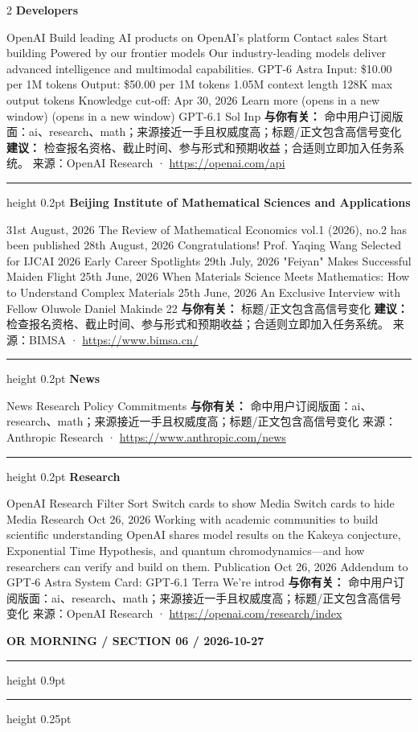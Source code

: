 \documentclass[10.5pt]{ctexart}
\begin{document}
\begin{multicols}{2}
{\large\bfseries Developers}\par
OpenAI Build leading AI products on OpenAI’s platform Contact sales Start building Powered by our frontier models Our industry-leading models deliver advanced intelligence and multimodal capabilities. GPT-6 Astra Input: \$10.00 per 1M tokens Output: \$50.00 per 1M tokens 1.05M context length 128K max output tokens Knowledge cut-off: Apr 30, 2026 Learn more (opens in a new window) (opens in a new window) GPT-6.1 Sol Inp
\textbf{与你有关：} 命中用户订阅版面：ai、research、math；来源接近一手且权威度高；标题/正文包含高信号变化
\textbf{建议：} 检查报名资格、截止时间、参与形式和预期收益；合适则立即加入任务系统。
{\footnotesize\color{ormuted} 来源：OpenAI Research · \url{https://openai.com/api}}
\vspace{2mm}
\hrule height 0.2pt
\vspace{2mm}
{\large\bfseries Beijing Institute of Mathematical Sciences and Applications}\par
31st August, 2026 The Review of Mathematical Economics vol.1 (2026), no.2 has been published 28th August, 2026 Congratulations! Prof. Yaqing Wang Selected for IJCAI 2026 Early Career Spotlights 29th July, 2026 "Feiyan" Makes Successful Maiden Flight 25th June, 2026 When Materials Science Meets Mathematics: How to Understand Complex Materials 25th June, 2026 An Exclusive Interview with Fellow Oluwole Daniel Makinde 22
\textbf{与你有关：} 标题/正文包含高信号变化
\textbf{建议：} 检查报名资格、截止时间、参与形式和预期收益；合适则立即加入任务系统。
{\footnotesize\color{ormuted} 来源：BIMSA · \url{https://www.bimsa.cn/}}
\vspace{2mm}
\hrule height 0.2pt
\vspace{2mm}
{\large\bfseries News}\par
News Research Policy Commitments
\textbf{与你有关：} 命中用户订阅版面：ai、research、math；来源接近一手且权威度高；标题/正文包含高信号变化
{\footnotesize\color{ormuted} 来源：Anthropic Research · \url{https://www.anthropic.com/news}}
\vspace{2mm}
\hrule height 0.2pt
\vspace{2mm}
{\large\bfseries Research}\par
OpenAI Research Filter Sort Switch cards to show Media Switch cards to hide Media Research Oct 26, 2026 Working with academic communities to build scientific understanding OpenAI shares model results on the Kakeya conjecture, Exponential Time Hypothesis, and quantum chromodynamics—and how researchers can verify and build on them. Publication Oct 26, 2026 Addendum to GPT‑6 Astra System Card: GPT‑6.1 Terra We’re introd
\textbf{与你有关：} 命中用户订阅版面：ai、research、math；来源接近一手且权威度高；标题/正文包含高信号变化
{\footnotesize\color{ormuted} 来源：OpenAI Research · \url{https://openai.com/research/index}}
\end{multicols}
\newpage
{\small\bfseries OR MORNING / SECTION 06 / 2026-10-27}
\vspace{2mm}
\hrule height 0.9pt
\vspace{1.5mm}
\hrule height 0.25pt
\vspace{4mm}
\end{document}
